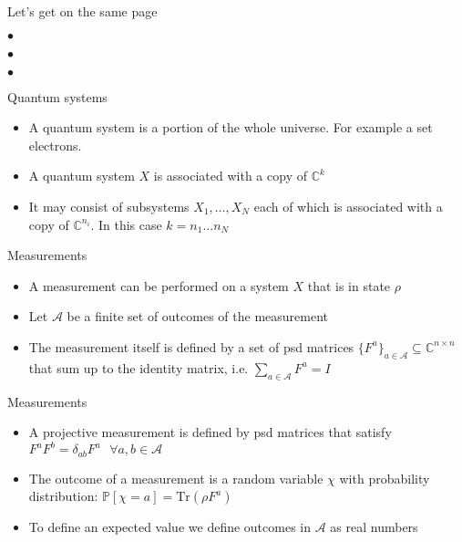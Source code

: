 \begin{frame}{Let's get on the same page}
 \begin{fullpageitemize}
  \item $\bullet$ 
  \item $\bullet$ 
  \item $\bullet$ 
 \end{fullpageitemize}
\end{frame}

\begin{frame}{Quantum systems}
\begin{itemize}
\item A quantum system is a portion of the whole universe. For example a set electrons. 
\item A quantum system $X$ is associated with a copy of $\mathbb{C}^k$ 
\item It may consist of subsystems $X_1, \dots , X_N$ each of which is associated with a copy of $\mathbb{C}^{n_i}$. In this case $k = n_1 \dots n_N$
\end{itemize}
\end{frame}

\begin{frame}{Measurements}
\begin{itemize}
    \item A measurement can be performed on a system $X$ that is in state $\rho$
    \item Let $\mathcal{A}$ be a finite set of outcomes of the measurement
    \item The measurement itself is defined by a set of psd matrices $\{ F^a \}_{a\in \mathcal{A}} \subseteq \mathbb{C}^{n \times n}$ that sum up to the identity matrix, i.e. $\sum_{a \in \mathcal{A}} F^a = I$
\end{itemize}
\end{frame}

\begin{frame}{Measurements}
\begin{itemize}
    \item A projective measurement is defined by psd matrices that satisfy $F^aF^b = \delta_{ab}F^a \text{ } \forall a,b \in \mathcal{A}$
    \item The outcome of a measurement is a random variable $\chi$ with probability distribution: $\mathbb{P}[ \chi = a ] = \text{Tr}(\rho F^a)$
    \item To define an expected value we define outcomes in $\mathcal{A}$ as real numbers
\end{itemize}
    
\end{frame}


